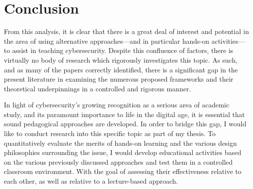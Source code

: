 \documentclass{article}
\begin{document}
\section{Conclusion}

    From this analysis, it is clear that there is a great deal of interest and potential in the area of using alternative approaches---and in particular hands-on activities---to assist in teaching cybersecurity. 
    Despite this confluence of factors, there is virtually no body of research which rigorously investigates this topic. 
    As such, and as many of the papers correctly identified, there is a significant gap in the present literature in examining the numerous proposed frameworks and their theoretical underpinnings in a controlled and rigorous manner. 

    In light of cybersecurity’s growing recognition as a serious area of academic study, and its paramount importance to life in the digital age, it is essential that sound pedagogical approaches are developed. 
    In order to bridge this gap, I would like to conduct research into this specific topic as part of my thesis. 
    To quantitatively evaluate the merits of hands-on learning and the various design philosophies surrounding the issue, I would develop educational activities based on the various previously discussed approaches and test them in a controlled classroom environment. 
    With the goal of assessing their effectiveness relative to each other, as well as relative to a lecture-based approach. 


\printbibliography
\end{document}
